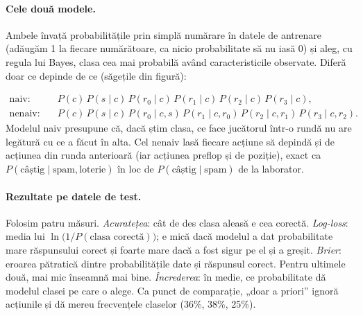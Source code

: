 \documentclass[10pt,a4paper]{article}
\begin{document}
\paragraph{Cele două modele.} Ambele învață probabilitățile prin simplă
numărare în datele de antrenare (adăugăm 1 la fiecare numărătoare, ca nicio
probabilitate să nu iasă 0) și aleg, cu regula lui Bayes, clasa cea mai
probabilă având caracteristicile observate. Diferă doar ce depinde de ce
(săgețile din figură):
\begin{center}
\end{center}
\vspace{-2mm}
\begin{align*}
\text{naiv:}\quad & P(c)\,P(s\mid c)\,P(r_0\mid c)\,P(r_1\mid c)\,P(r_2\mid c)\,P(r_3\mid c),\\
\text{nenaiv:}\quad & P(c)\,P(s\mid c)\,P(r_0\mid c,s)\,P(r_1\mid c,r_0)\,P(r_2\mid c,r_1)\,P(r_3\mid c,r_2).
\end{align*}
Modelul naiv presupune că, dacă știm clasa, ce face jucătorul într-o rundă
nu are legătură cu ce a făcut în alta. Cel nenaiv lasă fiecare acțiune să
depindă și de acțiunea din runda anterioară (iar acțiunea preflop și de
poziție), exact ca $P(\text{câștig}\mid\text{spam},\text{loterie})$ în loc de
$P(\text{câștig}\mid\text{spam})$ de la laborator.

\paragraph{Rezultate pe datele de test.} Folosim patru măsuri.
\emph{Acuratețea}: cât de des clasa aleasă e cea corectă. \emph{Log-loss}:
media lui $\ln\big(1/P(\text{clasa corectă})\big)$; e mică dacă modelul a dat
probabilitate mare răspunsului corect și foarte mare dacă a fost sigur pe el și
a greșit. \emph{Brier}: eroarea pătratică dintre probabilitățile date și
răspunsul corect. Pentru ultimele două, mai mic înseamnă mai bine.
\emph{Încrederea}: în medie, ce probabilitate dă modelul clasei pe care o
alege. Ca punct de comparație, „doar a priori'' ignoră acțiunile și dă mereu
frecvențele claselor (36\%, 38\%, 25\%).
\end{document}
